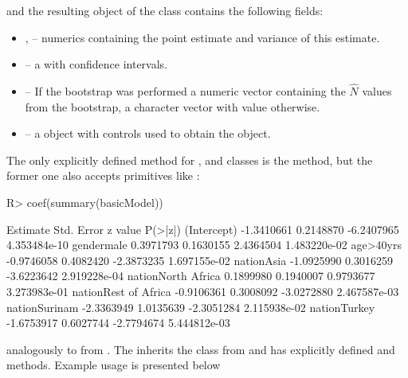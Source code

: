 \documentclass[
]{jss}
\newcommand{\1}{\mathcal{I}} \newcommand{\bZero}{\boldsymbol{0}}
\begin{document}
and the resulting object  of the 
class contains the following fields:

\begin{itemize}
  \item {},  -- numerics containing the point estimate and variance of this estimate.
  \item {} -- a  with confidence intervals.
  \item {} -- If the bootstrap was performed a numeric vector containing the $\hat{N}$ values from the bootstrap, a character vector with value  otherwise.
  \item {} -- a  object with controls used to obtain the object.
\end{itemize}

The only explicitly defined method for ,
 and 
classes is the  method, but the former one also accepts
 primitives like :

\begin{CodeChunk}
\begin{CodeInput}
R> coef(summary(basicModel))
\end{CodeInput}
\begin{CodeOutput}
                       Estimate Std. Error    z value      P(>|z|)
(Intercept)          -1.3410661  0.2148870 -6.2407965 4.353484e-10
gendermale            0.3971793  0.1630155  2.4364504 1.483220e-02
age>40yrs            -0.9746058  0.4082420 -2.3873235 1.697155e-02
nationAsia           -1.0925990  0.3016259 -3.6223642 2.919228e-04
nationNorth Africa    0.1899980  0.1940007  0.9793677 3.273983e-01
nationRest of Africa -0.9106361  0.3008092 -3.0272880 2.467587e-03
nationSurinam        -2.3363949  1.0135639 -2.3051284 2.115938e-02
nationTurkey         -1.6753917  0.6027744 -2.7794674 5.444812e-03
\end{CodeOutput}
\end{CodeChunk}

analogously to  from . The 
inherits the  class from  and has explicitly
defined  and  methods. Example usage is
presented below
\end{document}

